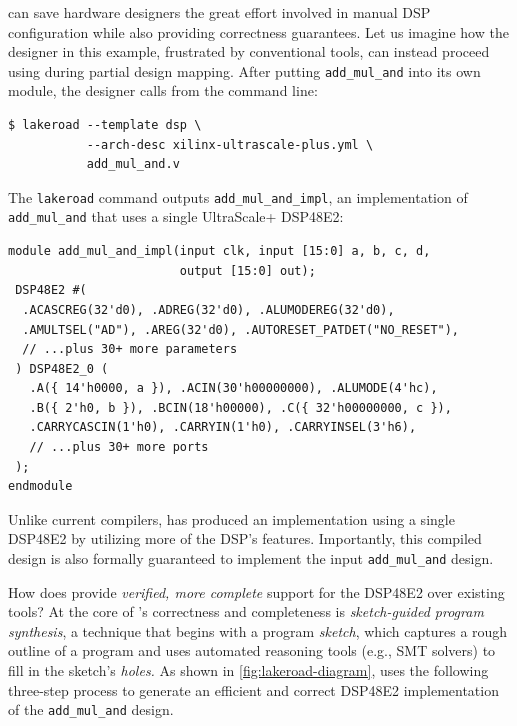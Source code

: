 \lr can save hardware designers
  the great effort involved
  in manual DSP configuration
  while also providing correctness guarantees.
Let us imagine how the designer 
  in this example,
  frustrated by conventional tools,
  can instead proceed using \lr
  during partial design mapping.
After putting 
  \texttt{add\_mul\_and}
  into its own module,
  the designer calls
  \lr from the command line:
\begin{verbatim}
$ lakeroad --template dsp \
           --arch-desc xilinx-ultrascale-plus.yml \
           add_mul_and.v
\end{verbatim}
The \texttt{lakeroad} command outputs
  \texttt{add\_mul\_and\_impl},
  an implementation
  of \texttt{add\_mul\_and}
  that uses a single UltraScale+ DSP48E2:
\begin{verbatim}
module add_mul_and_impl(input clk, input [15:0] a, b, c, d,
                        output [15:0] out);
 DSP48E2 #(
  .ACASCREG(32'd0), .ADREG(32'd0), .ALUMODEREG(32'd0),
  .AMULTSEL("AD"), .AREG(32'd0), .AUTORESET_PATDET("NO_RESET"), 
  // ...plus 30+ more parameters
 ) DSP48E2_0 (
   .A({ 14'h0000, a }), .ACIN(30'h00000000), .ALUMODE(4'hc),
   .B({ 2'h0, b }), .BCIN(18'h00000), .C({ 32'h00000000, c }),
   .CARRYCASCIN(1'h0), .CARRYIN(1'h0), .CARRYINSEL(3'h6),
   // ...plus 30+ more ports
 );
endmodule
\end{verbatim}
%
Unlike current compilers,
  \lr has produced an implementation
  using a single DSP48E2
  by utilizing more of the DSP's features.
Importantly, this compiled design
  is also formally guaranteed
  to implement
  the input \texttt{add\_mul\_and}
  design.

How does \lr provide 
  \textit{verified, more complete} support
  for the DSP48E2 over existing tools?  
At the core of \lr's
  correctness and completeness
  is
  \textit{sketch-guided program synthesis},
  a technique that  
  begins with a program \textit{sketch}, which
  captures a rough
  outline of a program
  and uses
  automated reasoning tools
  (e.g., SMT solvers)
  to fill in the sketch's \textit{holes.}
As shown in \cref{fig:lakeroad-diagram}, 
  \lr uses the following three-step process  
  to generate an efficient and correct
  DSP48E2 implementation
  of
  the \texttt{add\_mul\_and}
  design.

